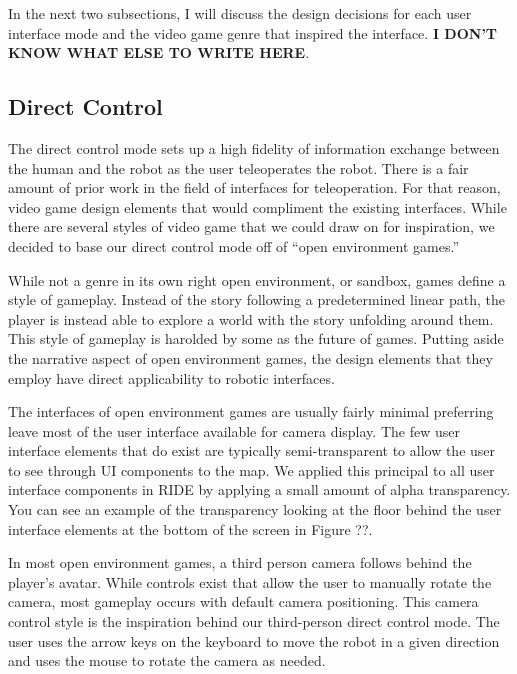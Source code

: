 In the next two subsections, I will discuss the design decisions for each user interface mode and the video game genre that inspired the interface. \textbf{I DON'T KNOW WHAT ELSE TO WRITE HERE}.

% 
\subsection{Direct Control}

The direct control mode sets up a high fidelity of information exchange between the human and the robot as the user teleoperates the robot. There is a fair amount of prior work in the field of interfaces for teleoperation. For that reason, video game design elements that would compliment the existing interfaces. While there are several styles of video game that we could draw on for inspiration, we decided to base our direct control mode off of ``open environment games.''

While not a genre in its own right open environment, or sandbox, games define a style of gameplay. Instead of the story following a predetermined linear path, the player is instead able to explore a world with the story unfolding around them. This style of gameplay is harolded by some as the future of games. Putting aside the narrative aspect of open environment games, the design elements that they employ have direct applicability to robotic interfaces.

The interfaces of open environment games are usually fairly minimal preferring leave most of the user interface available for camera display. The few user interface elements that do exist are typically semi-transparent to allow the user to see through UI components to the map. We applied this principal to all user interface components in RIDE by applying a small amount of alpha transparency. You can see an example of the transparency looking at the floor behind the user interface elements at the bottom of the screen in Figure ??. 

In most open environment games, a third person camera follows behind the player's avatar. While controls exist that allow the user to manually rotate the camera, most gameplay occurs with default camera positioning. This camera control style is the inspiration behind our third-person direct control mode. The user uses the arrow keys on the keyboard to move the robot in a given direction and uses the mouse to rotate the camera as needed.

